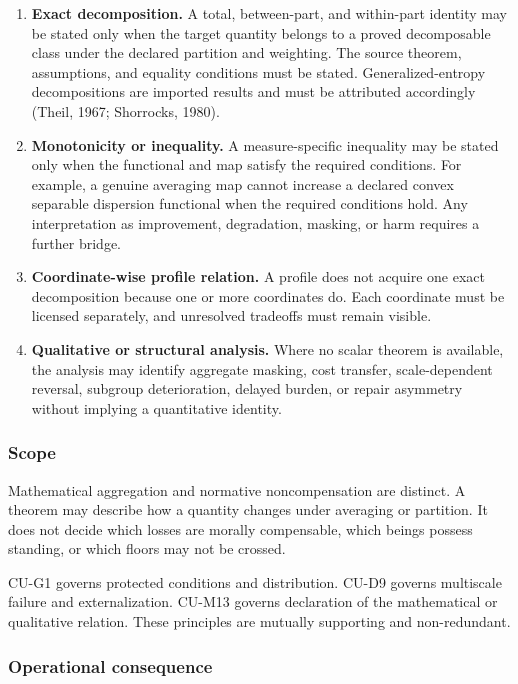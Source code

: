 \documentclass[
  11pt,
]{article}
\providecommand{\tightlist}{%
  \setlength{\itemsep}{0pt}\setlength{\parskip}{0pt}}
\begin{document}
\begin{enumerate}
\def\labelenumi{\arabic{enumi}.}
\tightlist
\item
  \textbf{Exact decomposition.} A total, between-part, and within-part
  identity may be stated only when the target quantity belongs to a
  proved decomposable class under the declared partition and weighting.
  The source theorem, assumptions, and equality conditions must be
  stated. Generalized-entropy decompositions are imported results and
  must be attributed accordingly (Theil, 1967; Shorrocks, 1980).
\item
  \textbf{Monotonicity or inequality.} A measure-specific inequality may
  be stated only when the functional and map satisfy the required
  conditions. For example, a genuine averaging map cannot increase a
  declared convex separable dispersion functional when the required
  conditions hold. Any interpretation as improvement, degradation,
  masking, or harm requires a further bridge.
\item
  \textbf{Coordinate-wise profile relation.} A profile does not acquire
  one exact decomposition because one or more coordinates do. Each
  coordinate must be licensed separately, and unresolved tradeoffs must
  remain visible.
\item
  \textbf{Qualitative or structural analysis.} Where no scalar theorem
  is available, the analysis may identify aggregate masking, cost
  transfer, scale-dependent reversal, subgroup deterioration, delayed
  burden, or repair asymmetry without implying a quantitative identity.
\end{enumerate}

\subsubsection{Scope}\label{scope-11}

Mathematical aggregation and normative noncompensation are distinct. A
theorem may describe how a quantity changes under averaging or
partition. It does not decide which losses are morally compensable,
which beings possess standing, or which floors may not be crossed.

CU-G1 governs protected conditions and distribution. CU-D9 governs
multiscale failure and externalization. CU-M13 governs declaration of
the mathematical or qualitative relation. These principles are mutually
supporting and non-redundant.

\subsubsection{Operational
consequence}\label{operational-consequence-21}
\end{document}
